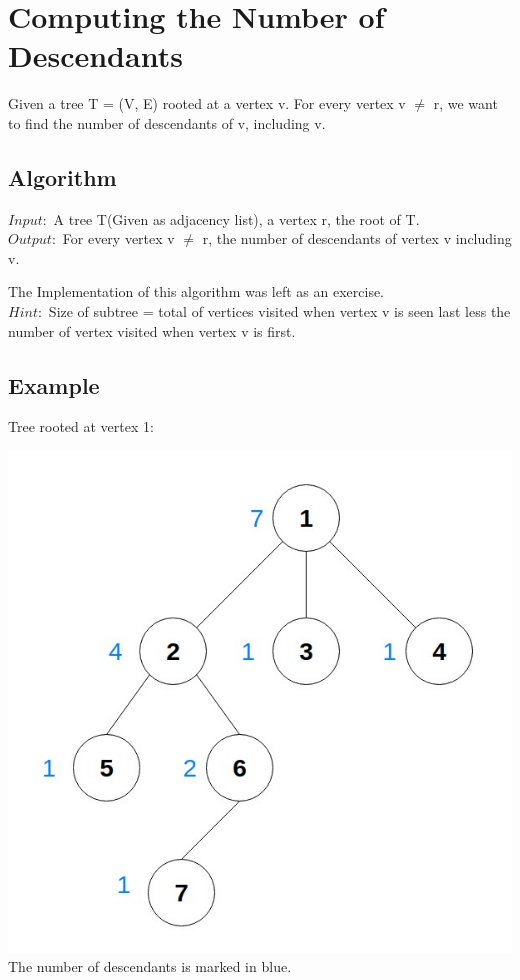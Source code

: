 \documentclass[twoside]{article}
\begin{document}
\section{Computing the Number of Descendants}
Given a tree T = (V, E) rooted at a vertex v. For every vertex v $\neq$ r, we want to find the number of descendants of v, including v.

\subsection{Algorithm}
$Input: $ A tree T(Given as adjacency list), a vertex r, the root of T. \\
$Output: $ For every vertex v $\neq$ r, the number of descendants of vertex v including v.

The Implementation of this algorithm was left as an exercise. \\
$Hint:$ Size of subtree = total of vertices visited when vertex v is seen last less the number of vertex visited when vertex v is first.

\subsection{Example}
Tree rooted at vertex 1:\\
\begin{center}
\includegraphics[scale=0.35]{g5} \\
The number of descendants is marked in blue.
\end{center}
\end{document}
